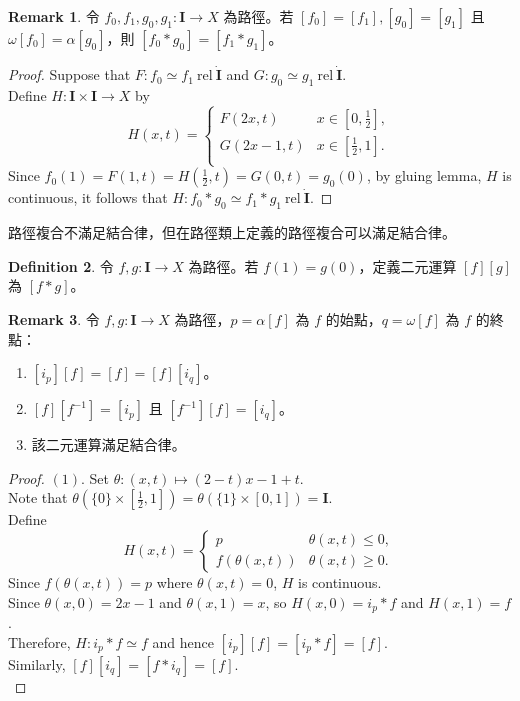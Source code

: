 \documentclass[12pt]{article}
\theoremstyle{definition}
\newtheorem{definition}{Definition}[section]
\newtheorem{remark}[definition]{Remark}
\newcommand\<{\langle}
\renewcommand\>{\rangle}
\newcommand\rel{\ \mathrm{rel}\ }
\begin{document}
\begin{CJK}{UTF8}{bsmi}
\begin{remark}
\label{path class with * is well-defined}
    令 $f_0, f_1, g_0, g_1:\textbf{I}\to X$ 為路徑。若 $[f_0]=[f_1], [g_0]=[g_1]$ 且 $\omega[f_0]=\alpha[g_0]$，則 $[f_0*g_0]=[f_1*g_1]$。
\end{remark}
\begin{proof}
    Suppose that $F:f_0\simeq f_1\rel\Dot{\textbf{I}}$ and $G:g_0\simeq g_1\rel\Dot{\textbf{I}}$. \\
    Define $H:\textbf{I}\times\textbf{I}\to X$ by 
    \[
        H(x, t) = \begin{cases}
            F(2x, t) & x\in[0, \frac{1}{2}], \\
            G(2x-1, t) & x\in[\frac{1}{2}, 1]. \\
        \end{cases}
    \]
    Since $f_0(1)=F(1, t)=H(\frac{1}{2}, t)=G(0, t)=g_0(0)$, by gluing lemma, $H$ is continuous, it follows that $H:f_0*g_0\simeq f_1*g_1\rel\Dot{\textbf{I}}$.
\end{proof}

路徑複合不滿足結合律，但在路徑類上定義的路徑複合可以滿足結合律。

\begin{definition}
    令 $f, g:\textbf{I}\to X$ 為路徑。若 $f(1)=g(0)$，定義二元運算 $[f][g]$ 為 $[f*g]$。
\end{definition}

\begin{remark}
    令 $f, g:\textbf{I}\to X$ 為路徑，$p=\alpha[f]$ 為 $f$ 的始點，$q=\omega[f]$ 為 $f$ 的終點：
    \begin{enumerate}
        \item $[i_p][f]=[f]=[f][i_q]$。
        \item $[f][f^{-1}]=[i_p]$ 且 $[f^{-1}][f]=[i_q]$。
        \item 該二元運算滿足結合律。
    \end{enumerate}
\end{remark}
\begin{proof}
    $(1)$. Set $\theta:(x, t)\mapsto(2-t)x-1+t$. \\
    Note that $\theta(\{0\}\times[\frac{1}{2}, 1])=\theta(\{1\}\times[0, 1])=\textbf{I}$. \\
    Define
    \[
        H(x, t) = \begin{cases}
            p & \theta(x, t)\le0, \\
            f(\theta(x, t)) & \theta(x, t)\ge0.
        \end{cases}
    \]
    Since $f(\theta(x, t))=p$ where $\theta(x, t)=0$, $H$ is continuous. \\
    Since $\theta(x, 0)=2x-1$ and $\theta(x, 1)=x$, so $H(x, 0)=i_p*f$ and $H(x, 1)=f$. \\
    Therefore, $H:i_p*f\simeq f$ and hence $[i_p][f]=[i_p*f]=[f]$. \\
    Similarly, $[f][i_q]=[f*i_q]=[f]$. \\
\end{proof}


\end{CJK}
\end{document}
